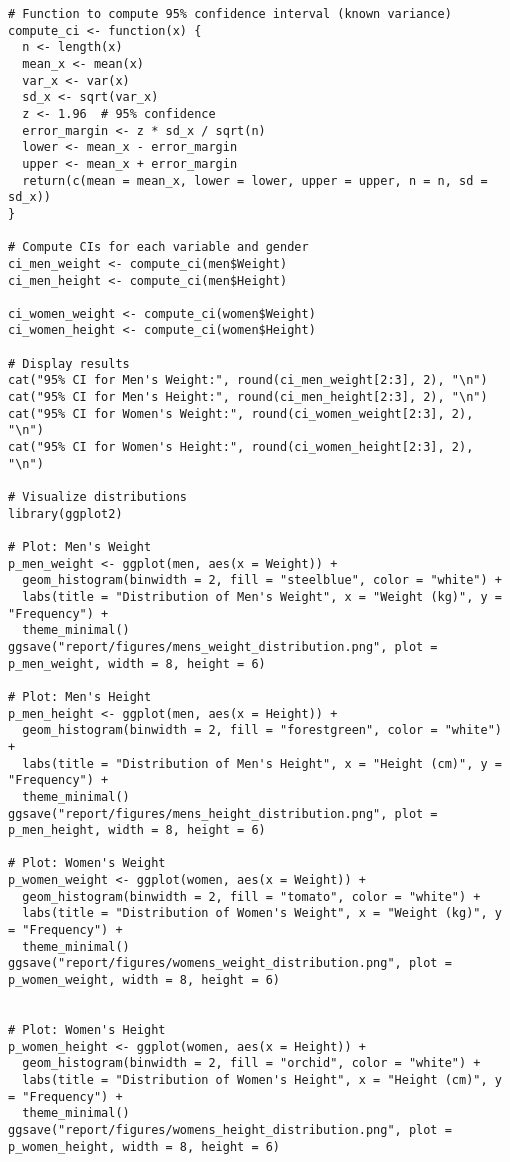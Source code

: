 \documentclass[12pt]{article}
\begin{document}
\begin{verbatim}
# Function to compute 95% confidence interval (known variance)
compute_ci <- function(x) {
  n <- length(x)
  mean_x <- mean(x)
  var_x <- var(x)
  sd_x <- sqrt(var_x)
  z <- 1.96  # 95% confidence
  error_margin <- z * sd_x / sqrt(n)
  lower <- mean_x - error_margin
  upper <- mean_x + error_margin
  return(c(mean = mean_x, lower = lower, upper = upper, n = n, sd = sd_x))
}

# Compute CIs for each variable and gender
ci_men_weight <- compute_ci(men$Weight)
ci_men_height <- compute_ci(men$Height)

ci_women_weight <- compute_ci(women$Weight)
ci_women_height <- compute_ci(women$Height)

# Display results
cat("95% CI for Men's Weight:", round(ci_men_weight[2:3], 2), "\n")
cat("95% CI for Men's Height:", round(ci_men_height[2:3], 2), "\n")
cat("95% CI for Women's Weight:", round(ci_women_weight[2:3], 2), "\n")
cat("95% CI for Women's Height:", round(ci_women_height[2:3], 2), "\n")

# Visualize distributions
library(ggplot2)

# Plot: Men's Weight
p_men_weight <- ggplot(men, aes(x = Weight)) +
  geom_histogram(binwidth = 2, fill = "steelblue", color = "white") +
  labs(title = "Distribution of Men's Weight", x = "Weight (kg)", y = "Frequency") +
  theme_minimal()
ggsave("report/figures/mens_weight_distribution.png", plot = p_men_weight, width = 8, height = 6)

# Plot: Men's Height
p_men_height <- ggplot(men, aes(x = Height)) +
  geom_histogram(binwidth = 2, fill = "forestgreen", color = "white") +
  labs(title = "Distribution of Men's Height", x = "Height (cm)", y = "Frequency") +
  theme_minimal()
ggsave("report/figures/mens_height_distribution.png", plot = p_men_height, width = 8, height = 6)

# Plot: Women's Weight
p_women_weight <- ggplot(women, aes(x = Weight)) +
  geom_histogram(binwidth = 2, fill = "tomato", color = "white") +
  labs(title = "Distribution of Women's Weight", x = "Weight (kg)", y = "Frequency") +
  theme_minimal()
ggsave("report/figures/womens_weight_distribution.png", plot = p_women_weight, width = 8, height = 6)


# Plot: Women's Height
p_women_height <- ggplot(women, aes(x = Height)) +
  geom_histogram(binwidth = 2, fill = "orchid", color = "white") +
  labs(title = "Distribution of Women's Height", x = "Height (cm)", y = "Frequency") +
  theme_minimal()
ggsave("report/figures/womens_height_distribution.png", plot = p_women_height, width = 8, height = 6)



\end{verbatim}
\end{document}
